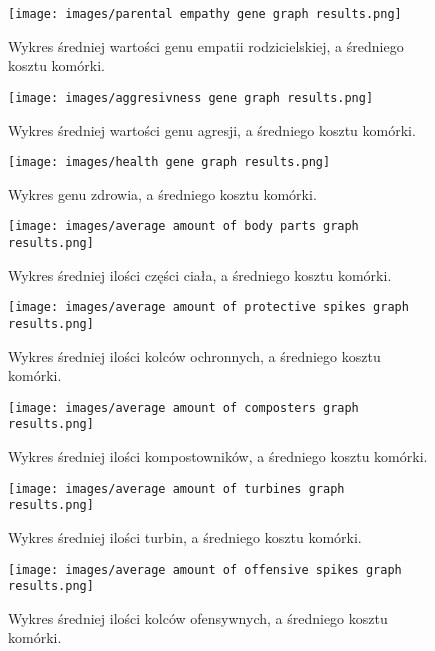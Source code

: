 \documentclass{article}
\begin{document}
\begin{figure}[H]
    \centering
    \texttt{[image: images/parental empathy gene graph results.png]}
    \caption{Wykres średniej wartości genu empatii rodzicielskiej, a średniego kosztu komórki.}
\end{figure}

\begin{figure}[H]
    \centering
    \texttt{[image: images/aggresivness gene graph results.png]}
    \caption{Wykres średniej wartości genu agresji, a średniego kosztu komórki.}
\end{figure}

\begin{figure}[H]
    \centering
    \texttt{[image: images/health gene graph results.png]}
    \caption{Wykres genu zdrowia, a średniego kosztu komórki.}
\end{figure}

\begin{figure}[H]
    \centering
    \texttt{[image: images/average amount of body parts graph results.png]}
    \caption{Wykres średniej ilości części ciała, a średniego kosztu komórki.}
\end{figure}

\begin{figure}[H]
    \centering
    \texttt{[image: images/average amount of protective spikes graph results.png]}
    \caption{Wykres średniej ilości kolców ochronnych, a średniego kosztu komórki.}
\end{figure}

\begin{figure}[H]
    \centering
    \texttt{[image: images/average amount of composters graph results.png]}
    \caption{Wykres średniej ilości kompostowników, a średniego kosztu komórki.}
\end{figure}

\begin{figure}[H]
    \centering
    \texttt{[image: images/average amount of turbines graph results.png]}
    \caption{Wykres średniej ilości turbin, a średniego kosztu komórki.}
\end{figure}

\begin{figure}[H]
    \centering
    \texttt{[image: images/average amount of offensive spikes graph results.png]}
    \caption{Wykres średniej ilości kolców ofensywnych, a średniego kosztu komórki.}
\end{figure}
\end{document}
